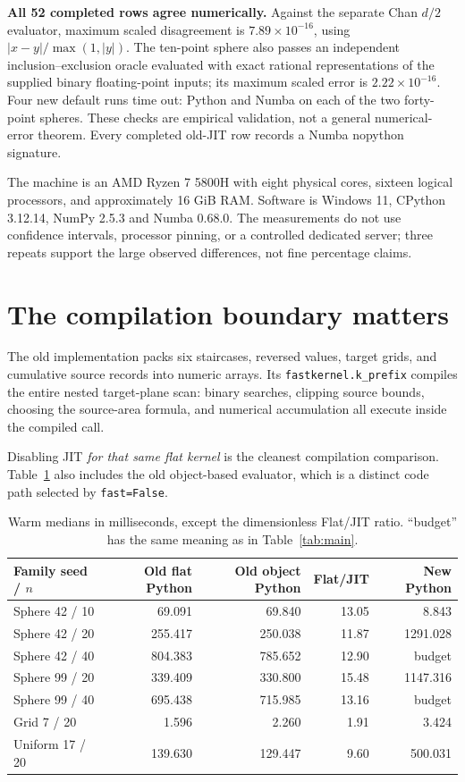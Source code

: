 \documentclass[12pt,a4paper]{article}
\begin{document}
\textbf{All 52 completed rows agree numerically.} Against the separate Chan
$d/2$ evaluator, maximum scaled disagreement is $7.89\times10^{-16}$, using
$|x-y|/\max(1,|y|)$. The ten-point sphere also passes an independent
inclusion--exclusion oracle evaluated with exact rational representations of
the supplied binary floating-point inputs; its maximum scaled error is
$2.22\times10^{-16}$. Four new default runs time out: Python and Numba on
each of the two forty-point spheres. These checks are empirical validation,
not a general numerical-error theorem. Every completed old-JIT row records
a Numba nopython signature.

The machine is an AMD Ryzen 7 5800H with eight physical cores, sixteen logical
processors, and approximately 16 GiB RAM. Software is Windows 11,
CPython 3.12.14, NumPy 2.5.3 and Numba 0.68.0. The measurements do not use
confidence intervals, processor pinning, or a controlled dedicated server;
three repeats support the large observed differences, not fine percentage claims.

\section{The compilation boundary matters}
The old implementation packs six staircases, reversed values, target grids,
and cumulative source records into numeric arrays. Its
\texttt{fastkernel.k\_prefix} compiles the entire nested target-plane scan:
binary searches, clipping source bounds, choosing the source-area formula,
and numerical accumulation all execute inside the compiled call.

Disabling JIT \emph{for that same flat kernel} is the cleanest compilation
comparison. Table~\ref{tab:python} also includes the old object-based evaluator,
which is a distinct code path selected by \texttt{fast=False}.

\begin{table}[ht]
\centering\small
\setlength{\tabcolsep}{5pt}
\begin{tabular}{lrrrr}\toprule
Family seed / $n$ & Old flat Python & Old object Python & Flat/JIT & New Python\\\midrule
Sphere 42 / 10 & 69.091 & 69.840 & 13.05 & 8.843\\
Sphere 42 / 20 & 255.417 & 250.038 & 11.87 & 1291.028\\
Sphere 42 / 40 & 804.383 & 785.652 & 12.90 & budget\\
Sphere 99 / 20 & 339.409 & 330.800 & 15.48 & 1147.316\\
Sphere 99 / 40 & 695.438 & 715.985 & 13.16 & budget\\
Grid 7 / 20 & 1.596 & 2.260 & 1.91 & 3.424\\
Uniform 17 / 20 & 139.630 & 129.447 & 9.60 & 500.031\\
\bottomrule\end{tabular}
\caption{Warm medians in milliseconds, except the dimensionless Flat/JIT
ratio. ``budget'' has the same meaning as in Table~\ref{tab:main}.}
\label{tab:python}
\end{table}
\end{document}

